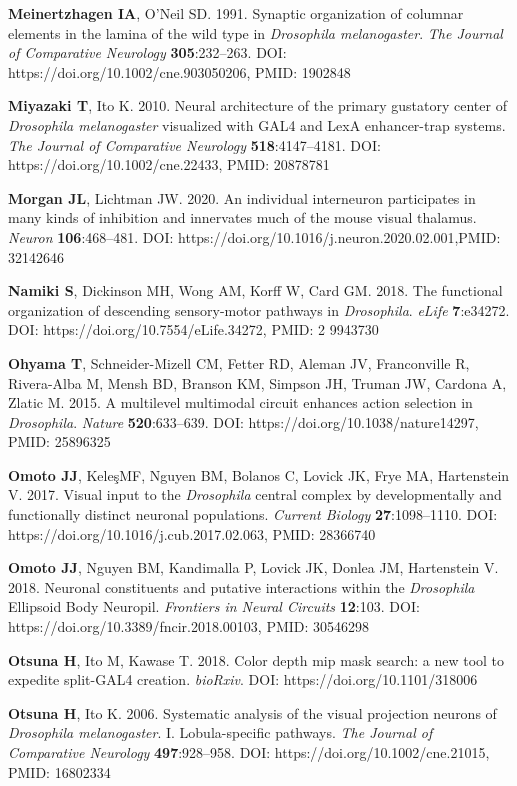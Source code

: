 \documentclass{article}
\begin{document}
\begin{hangpars}
\textbf{Meinertzhagen IA}, O’Neil SD. 1991. Synaptic organization of columnar elements in the lamina of the wild type in \emph{Drosophila melanogaster}. \emph{The Journal of Comparative Neurology} \textbf{305}:232–263. DOI: https://doi.org/10.1002/cne.903050206, PMID: 1902848

\textbf{Miyazaki T}, Ito K. 2010. Neural architecture of the primary gustatory center of \emph{Drosophila melanogaster} visualized with GAL4 and LexA enhancer-trap systems. \emph{The Journal of Comparative Neurology} \textbf{518}:4147–4181. DOI: https://doi.org/10.1002/cne.22433, PMID: 20878781

\textbf{Morgan JL}, Lichtman JW. 2020. An individual interneuron participates in many kinds of inhibition and innervates much of the mouse visual thalamus. \emph{Neuron} \textbf{106}:468–481. DOI: https://doi.org/10.1016/j.neuron.2020.02.001,PMID: 32142646

\textbf{Namiki S}, Dickinson MH, Wong AM, Korff W, Card GM. 2018. The functional organization of descending sensory-motor pathways in \emph{Drosophila}. \emph{eLife} \textbf{7}:e34272. DOI: https://doi.org/10.7554/eLife.34272, PMID: 2 9943730

\textbf{Ohyama T}, Schneider-Mizell CM, Fetter RD, Aleman JV, Franconville R, Rivera-Alba M, Mensh BD, Branson KM, Simpson JH, Truman JW, Cardona A, Zlatic M. 2015. A multilevel multimodal circuit enhances action selection in \emph{Drosophila}. \emph{Nature} \textbf{520}:633–639. DOI: https://doi.org/10.1038/nature14297, PMID: 25896325

\textbf{Omoto JJ}, KeleşMF, Nguyen BM, Bolanos C, Lovick JK, Frye MA, Hartenstein V. 2017. Visual input to the \emph{Drosophila} central complex by developmentally and functionally distinct neuronal populations. \emph{Current Biology} \textbf{27}:1098–1110. DOI: https://doi.org/10.1016/j.cub.2017.02.063, PMID: 28366740

\textbf{Omoto JJ}, Nguyen BM, Kandimalla P, Lovick JK, Donlea JM, Hartenstein V. 2018. Neuronal constituents and putative interactions within the \emph{Drosophila} Ellipsoid Body Neuropil. \emph{Frontiers in Neural Circuits} \textbf{12}:103. DOI: https://doi.org/10.3389/fncir.2018.00103, PMID: 30546298

\textbf{Otsuna H}, Ito M, Kawase T. 2018. Color depth mip mask search: a new tool to expedite split-GAL4 creation. \emph{bioRxiv}. DOI: https://doi.org/10.1101/318006

\textbf{Otsuna H}, Ito K. 2006. Systematic analysis of the visual projection neurons of \emph{Drosophila melanogaster}. I. Lobula-specific pathways. \emph{The Journal of Comparative Neurology} \textbf{497}:928–958. DOI: https://doi.org/10.1002/cne.21015, PMID: 16802334


\end{hangpars}
\end{document}
